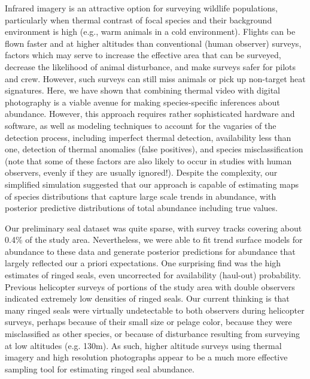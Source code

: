 \documentclass[12pt,fleqn]{article}
\begin{document}
\begin{flushleft}
Infrared imagery is an attractive option for surveying wildlife populations, particularly when thermal contrast of focal species and their background environment is high (e.g., warm animals in a cold environment). Flights can be flown faster and at higher altitudes than conventional (human observer) surveys, factors which may serve to increase the effective area that can be surveyed, decrease the likelihood of animal disturbance, and make surveys safer for pilots and crew.  However, such surveys can still miss animals or pick up non-target heat signatures.  Here, we have shown that combining thermal video with digital photography is a viable avenue for making species-specific inferences about abundance.  However, this approach requires rather sophisticated hardware and software, as well as modeling techniques to account for the vagaries of the detection process, including imperfect thermal detection, availability less than one, detection of thermal anomalies (false positives), and species misclassification (note that some of these factors are also likely to occur in studies with human observers, evenly if they are usually ignored!).
Despite the complexity, our simplified simulation suggested that our approach is capable of estimating maps of species distributions that capture large scale trends in abundance, with posterior predictive distributions of total abundance including true values.

\hspace{.5in}Our preliminary seal dataset was quite sparse, with survey tracks covering about 0.4\% of the study area.  Nevertheless, we were able to fit trend surface models for abundance to these data and generate posterior predictions for abundance that largely reflected
our a priori expectations.  One surprising find was the high estimates of ringed seals, even uncorrected for availability (haul-out) probability.  Previous helicopter surveys of portions of the study area with double observers \citep[see e.g.][]{ConnEtAl2013,VerHoefEtAl2013} indicated extremely low densities of ringed seals.  Our current thinking is that many ringed seals were virtually undetectable to both observers during helicopter surveys, perhaps because of their small size or pelage color, because they were misclassified as other species, or because of disturbance resulting from surveying at low altitudes (e.g. 130m). As such, higher altitude surveys using thermal imagery and high resolution photographs appear to be a much more effective sampling tool for estimating ringed seal abundance.


\end{flushleft}
\end{document}

